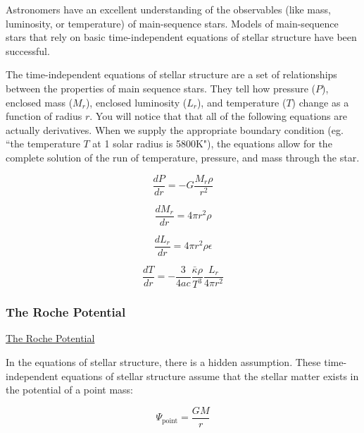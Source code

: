 \documentclass[12pt]{article} %
\numberwithin{equation}{section} %
\begin{document}
Astronomers have an excellent understanding of the observables (like mass, luminosity, or temperature) of main-sequence stars. Models of main-sequence stars that rely on basic time-independent equations of stellar structure have been successful.

The time-independent equations of stellar structure  are a set of relationships between the properties of main sequence stars. They tell how pressure ($P$), enclosed mass ($M_{r}$), enclosed luminosity ($L_{r}$), and temperature ($T$) change as a function of radius $r$. You will notice that that all of the following equations are actually derivatives. When we supply the appropriate boundary condition (eg. ``the temperature $T$ at 1 solar radius is 5800K"), the equations allow for the complete solution of the run of temperature, pressure, and mass through the star.

\begin{equation} \label{stellar_structure1}
\frac{dP}{dr} = -G \frac{M_{r} \rho}{r^{2}} 
\end{equation}

\begin{equation} \label{stellar_structure2}
\frac{dM_{r}}{dr} = 4 \pi r^{2} \rho
\end{equation}

\begin{equation} \label{stellar_structure3}
\frac{dL_{r}}{dr} = 4 \pi r^{2} \rho \epsilon
\end{equation}

\begin{equation} \label{stellar_structure4}
\frac{dT}{dr} = - \frac{3}{4ac} \frac{\bar{\kappa} \rho}{T^{3}} \frac{L_{r}}{4 \pi r^{2}}
\end{equation}

\subsubsection{The Roche Potential}{\hyperlink{toc}{The Roche Potential}} \label{sec: The Roche Potential}

In the equations of stellar structure, there is a hidden assumption. These time-independent equations of stellar structure assume that the stellar matter exists in the potential of a point mass:

\begin{equation} \label{point_mass}
\Psi_{\text{point}} = \frac{GM}{r}
\end{equation}
\end{document}
